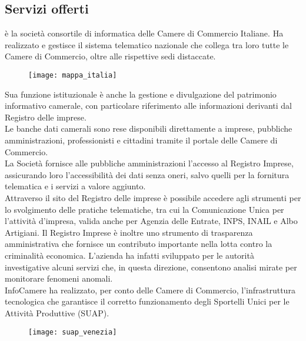 	\subsection{Servizi offerti}
	\nomeAzienda è la società consortile di informatica delle Camere di Commercio Italiane. Ha realizzato e gestisce il sistema telematico nazionale che collega tra loro tutte le Camere di Commercio, oltre alle rispettive sedi distaccate. 
	
	\begin{figure}[htbp]
		\begin{center}
			\texttt{[image: mappa\_italia]}
		\end{center}
	\end{figure}
	
	Sua funzione istituzionale è anche la gestione e divulgazione del patrimonio informativo camerale, con particolare riferimento alle informazioni derivanti dal Registro delle imprese.\\
	Le banche dati camerali sono rese disponibili direttamente a imprese, pubbliche amministrazioni, professionisti e cittadini tramite il portale delle Camere di Commercio. \\
	La Società fornisce alle pubbliche amministrazioni l'accesso al Registro Imprese, assicurando loro l'accessibilità dei dati senza oneri, salvo quelli per la fornitura telematica e i servizi a valore aggiunto. \\
	Attraverso il sito del Registro delle imprese è possibile accedere agli strumenti per lo svolgimento delle pratiche telematiche, tra cui la Comunicazione Unica per l'attività d'impresa, valida anche per Agenzia delle Entrate, INPS, INAIL e Albo Artigiani. Il Registro Imprese è inoltre uno strumento di trasparenza amministrativa che fornisce un contributo importante nella lotta contro la criminalità economica. L'azienda ha infatti sviluppato per le autorità investigative alcuni servizi che, in questa direzione, consentono analisi mirate per monitorare fenomeni anomali. \\
	InfoCamere ha realizzato, per conto delle Camere di Commercio, l'infrastruttura tecnologica che garantisce il corretto funzionamento degli Sportelli Unici per le Attività Produttive (SUAP).
	
	\begin{figure}[htbp]
		\begin{center}
			\texttt{[image: suap\_venezia]}
		\end{center}
	\end{figure}
	
